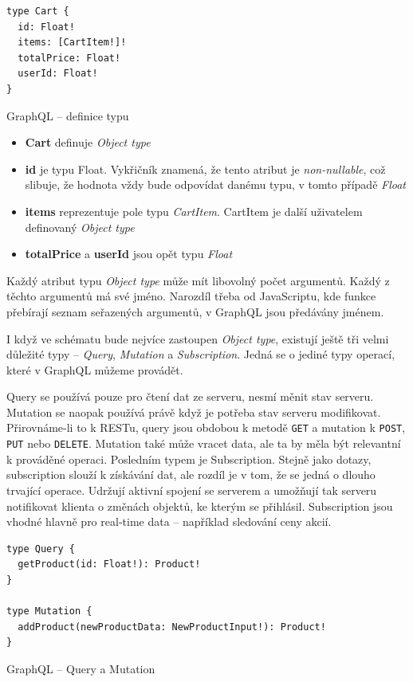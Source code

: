 \documentclass[thesis=M,czech]{FITthesis}[2019/12/23]
\begin{document}
\begin{listing}[H]
\begin{verbatim}
type Cart {
  id: Float!
  items: [CartItem!]!
  totalPrice: Float!
  userId: Float!
}
\end{verbatim}
\caption{GraphQL -- definice typu}
\label{lst:graphql_type}
\end{listing}

\begin{itemize}
    \item \textbf{Cart} definuje \textit{Object type}
    \item \textbf{id} je typu Float. Vykřičník znamená, že tento atribut je \textit{non-nullable}, což slibuje, že hodnota vždy bude odpovídat danému typu, v tomto případě \textit{Float}
    \item \textbf{items} reprezentuje pole typu \textit{CartItem}. CartItem je další uživatelem definovaný \textit{Object type}
    \item \textbf{totalPrice} a \textbf{userId} jsou opět typu \textit{Float}
\end{itemize}

Každý atribut typu \textit{Object type} může mít libovolný počet argumentů. Každý z těchto argumentů má své jméno. Narozdíl třeba od JavaScriptu, kde funkce přebírají seznam seřazených argumentů, v GraphQL jsou předávány jménem.

I když ve schématu bude nejvíce zastoupen \textit{Object type}, existují ještě tři velmi důležité typy -- \textit{Query}, \textit{Mutation} a \textit{Subscription}. Jedná se o jediné typy operací, které v GraphQL můžeme provádět.

Query se používá pouze pro čtení dat ze serveru, nesmí měnit stav serveru. Mutation se naopak používá právě když je potřeba stav serveru modifikovat. Přirovnáme-li to k RESTu, query jsou obdobou k metodě \texttt{GET} a mutation k \texttt{POST}, \texttt{PUT} nebo \texttt{DELETE}. Mutation také může vracet data, ale ta by měla být relevantní k prováděné operaci.
Posledním typem je Subscription. Stejně jako dotazy, subscription slouží k získávání dat, ale rozdíl je v tom, že se jedná o dlouho trvající operace. Udržují aktivní spojení se serverem a umožňují tak serveru notifikovat klienta o změnách objektů, ke kterým se přihlásil. Subscription jsou vhodné hlavně pro real-time data -- například sledování ceny akcií.

\begin{listing}[H]
\begin{verbatim}
type Query {    
  getProduct(id: Float!): Product!
}

type Mutation {
  addProduct(newProductData: NewProductInput!): Product!
}
\end{verbatim}
\caption{GraphQL -- Query a Mutation}
\label{lst:graphql_query_mutation}
\end{listing}
\end{document}
